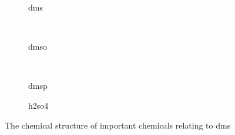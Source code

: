 	\begin{figure}
	    \centering
	    \begin{subfigure}[b]{0.4\textwidth}
	        \centering
	        \caption{\gls{dms}}
	        \label{fig:dms}
	    \end{subfigure}
	    ~ %
	    \begin{subfigure}[b]{0.4\textwidth}
	        \centering
	        \caption{\gls{dmso}}
	        \label{fig:dmso}
	    \end{subfigure}
	    ~ %

	    \begin{subfigure}[b]{0.4\textwidth}
	        \centering
	        \caption{\gls{dmsp}}
	        \label{fig:dmsp}
	    \end{subfigure}
	    \begin{subfigure}[b]{0.4\textwidth}
	        \centering
	        \caption{\gls{h2so4}}
	        \label{fig:h2so4}
	    \end{subfigure}
	    \caption{The chemical structure of important chemicals relating to \gls{dms} }\label{fig:chem}
	\end{figure}




